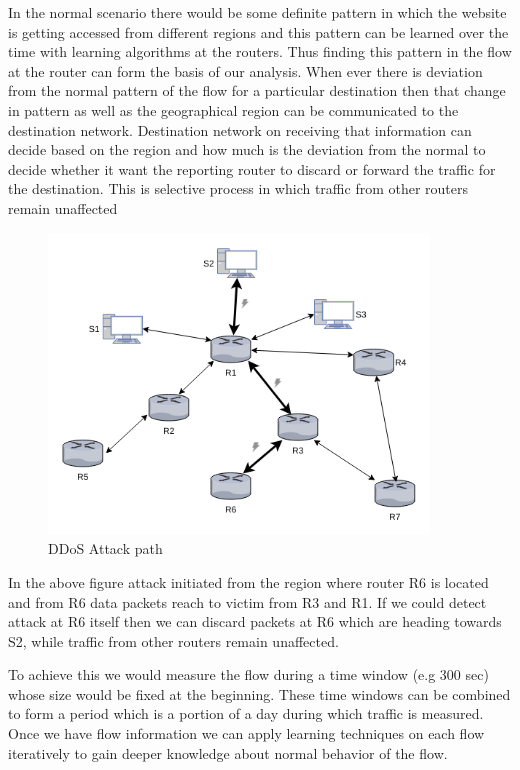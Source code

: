 \documentclass[10pt,oneside,a4paper]{report}
\begin{document}
In the normal scenario there would be some definite pattern in which the website is getting accessed from different regions and this pattern can be learned over the time with learning algorithms at the routers. Thus finding this pattern in the flow at the router can form the basis of our analysis. When ever there is deviation from the normal pattern of the flow for a particular destination then that change in pattern as well as the geographical region can be communicated to the destination network. Destination network on receiving that information can decide based on the region and how much is the deviation from the normal to decide whether it want the reporting router to discard or forward the traffic for the destination. This is selective process in which traffic from other routers remain unaffected\par

\begin{figure}[H]
  \centering
    \includegraphics[width=0.90\textwidth]{RouterCommunication}
    \caption{DDoS Attack path}
\end{figure}


In the above figure attack initiated from the region where router R6 is located and from R6 data packets reach to victim from R3 and R1. If we could detect attack at R6 itself then we can discard packets at R6 which are heading towards S2, while traffic from other routers remain unaffected.

To achieve this we would measure the flow during a time window (e.g 300 sec) whose size would be fixed at the beginning.
These time windows can be combined to form a period which is a portion of a day during which traffic is measured. Once we have flow information we can apply learning techniques on each flow iteratively to gain deeper knowledge about normal behavior of the flow.\par
\end{document}
